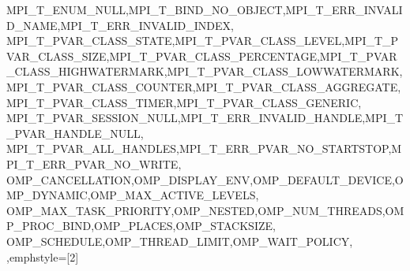 {{{{{    %
    MPI_T_ENUM_NULL,MPI_T_BIND_NO_OBJECT,MPI_T_ERR_INVALID_NAME,MPI_T_ERR_INVALID_INDEX,
    MPI_T_PVAR_CLASS_STATE,MPI_T_PVAR_CLASS_LEVEL,MPI_T_PVAR_CLASS_SIZE,MPI_T_PVAR_CLASS_PERCENTAGE,MPI_T_PVAR_CLASS_HIGHWATERMARK,MPI_T_PVAR_CLASS_LOWWATERMARK,MPI_T_PVAR_CLASS_COUNTER,MPI_T_PVAR_CLASS_AGGREGATE,MPI_T_PVAR_CLASS_TIMER,MPI_T_PVAR_CLASS_GENERIC,
    MPI_T_PVAR_SESSION_NULL,MPI_T_ERR_INVALID_HANDLE,MPI_T_PVAR_HANDLE_NULL,
    MPI_T_PVAR_ALL_HANDLES,MPI_T_ERR_PVAR_NO_STARTSTOP,MPI_T_ERR_PVAR_NO_WRITE,
    OMP_CANCELLATION,OMP_DISPLAY_ENV,OMP_DEFAULT_DEVICE,OMP_DYNAMIC,OMP_MAX_ACTIVE_LEVELS,
    OMP_MAX_TASK_PRIORITY,OMP_NESTED,OMP_NUM_THREADS,OMP_PROC_BIND,OMP_PLACES,OMP_STACKSIZE,
    OMP_SCHEDULE,OMP_THREAD_LIMIT,OMP_WAIT_POLICY,
  },emphstyle={[2]\color{green!40!black}}
}

}}}
